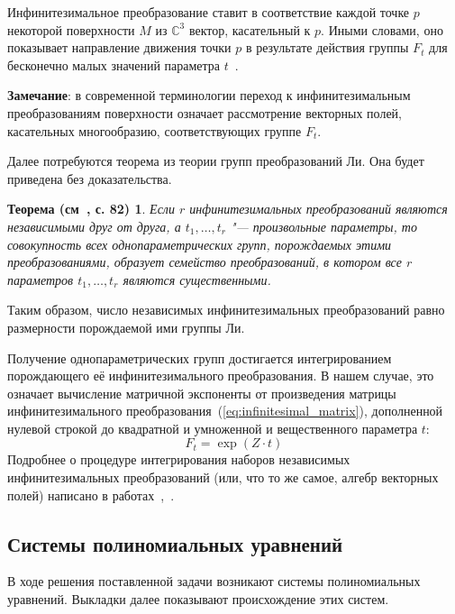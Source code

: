 \documentclass[../main.tex]{subfiles}
\newtheorem*{lie_theorem}{Теорема (см~\cite{lie}, с. 82)}
\begin{document}
Инфинитезимальное преобразование ставит в соответствие каждой точке $p$ некоторой поверхности $M$ из $\mathbb{C}^3$ вектор, касательный к $p$. Иными словами, оно показывает направление движения точки $p$ в результате действия группы $F_t$ для бесконечно малых значений параметра $t$~\cite{lie}.

\textbf{Замечание}: в современной терминологии переход к инфинитезимальным преобразованиям поверхности означает рассмотрение векторных полей, касательных многообразию, соответствующих группе $F_t$.

Далее потребуются теорема из теории групп преобразований Ли. Она будет приведена без доказательства.
\begin{lie_theorem}\label{thm:lie}
Если $r$ инфинитезимальных преобразований являются независимыми друг от друга, а $t_1,\hdots,t_r$ "--- произвольные параметры, то совокупность всех однопараметрических групп, порождаемых этими преобразованиями, образует семейство преобразований, в котором все $r$  параметров $t_1,\hdots,t_r$ являются существенными.
\end{lie_theorem}

Таким образом, число независимых инфинитезимальных преобразований равно размерности порождаемой ими группы Ли. 

Получение однопараметрических групп достигается интегрированием порождающего её инфинитезимального преобразования. В нашем случае, это означает вычисление матричной экспоненты от произведения матрицы инфинитезимального преобразования~(\ref{eq:infinitesimal_matrix}), дополненной нулевой строкой до квадратной и умноженной и вещественного параметра $t$:
$$
	F_t = \exp(Z \cdot t)
$$
Подробнее о процедуре интегрирования наборов независимых инфинитезимальных преобразований (или, что то же самое, алгебр векторных полей) написано в работах~\cite{loboda_hodarev},~\cite{fels}.

\subsection{Системы полиномиальных уравнений}
В ходе решения поставленной задачи возникают системы полиномиальных уравнений. Выкладки далее показывают происхождение этих систем.
\end{document}
